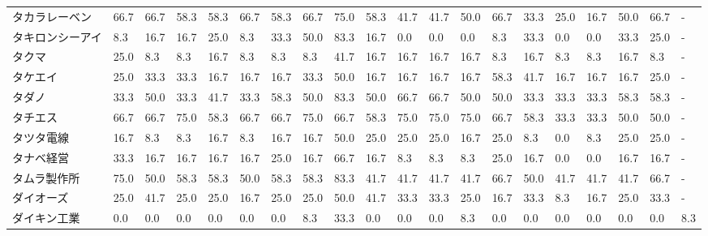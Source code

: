 \begin{tabular}{llllllllllllllllllll}
タカラレーベン         &   66.7 &   66.7 &      58.3 &      58.3 &       66.7 &   58.3 &   66.7 &   75.0 &    58.3 &    41.7 &   41.7 &  50.0 &   66.7 &    33.3 &    25.0 &  16.7 &  50.0 &  66.7 &     - \\
タキロンシーアイ        &    8.3 &   16.7 &      16.7 &      25.0 &        8.3 &   33.3 &   50.0 &   83.3 &    16.7 &     0.0 &    0.0 &   0.0 &    8.3 &    33.3 &     0.0 &   0.0 &  33.3 &  25.0 &     - \\
タクマ             &   25.0 &    8.3 &       8.3 &      16.7 &        8.3 &    8.3 &    8.3 &   41.7 &    16.7 &    16.7 &   16.7 &  16.7 &    8.3 &    16.7 &     8.3 &   8.3 &  16.7 &   8.3 &     - \\
タケエイ            &   25.0 &   33.3 &      33.3 &      16.7 &       16.7 &   16.7 &   33.3 &   50.0 &    16.7 &    16.7 &   16.7 &  16.7 &   58.3 &    41.7 &    16.7 &  16.7 &  16.7 &  25.0 &     - \\
タダノ             &   33.3 &   50.0 &      33.3 &      41.7 &       33.3 &   58.3 &   50.0 &   83.3 &    50.0 &    66.7 &   66.7 &  50.0 &   50.0 &    33.3 &    33.3 &  33.3 &  58.3 &  58.3 &     - \\
タチエス            &   66.7 &   66.7 &      75.0 &      58.3 &       66.7 &   66.7 &   75.0 &   66.7 &    58.3 &    75.0 &   75.0 &  75.0 &   66.7 &    58.3 &    33.3 &  33.3 &  50.0 &  50.0 &     - \\
タツタ電線           &   16.7 &    8.3 &       8.3 &      16.7 &        8.3 &   16.7 &   16.7 &   50.0 &    25.0 &    25.0 &   25.0 &  16.7 &   25.0 &     8.3 &     0.0 &   8.3 &  25.0 &  25.0 &     - \\
タナベ経営           &   33.3 &   16.7 &      16.7 &      16.7 &       16.7 &   25.0 &   16.7 &   66.7 &    16.7 &     8.3 &    8.3 &   8.3 &   25.0 &    16.7 &     0.0 &   0.0 &  16.7 &  16.7 &     - \\
タムラ製作所          &   75.0 &   50.0 &      58.3 &      58.3 &       50.0 &   58.3 &   58.3 &   83.3 &    41.7 &    41.7 &   41.7 &  41.7 &   66.7 &    50.0 &    41.7 &  41.7 &  41.7 &  66.7 &     - \\
ダイオーズ           &   25.0 &   41.7 &      25.0 &      25.0 &       16.7 &   25.0 &   25.0 &   50.0 &    41.7 &    33.3 &   33.3 &  25.0 &   16.7 &    33.3 &     8.3 &  16.7 &  25.0 &  33.3 &     - \\
ダイキン工業          &    0.0 &    0.0 &       0.0 &       0.0 &        0.0 &    0.0 &    8.3 &   33.3 &     0.0 &     0.0 &    0.0 &   8.3 &    0.0 &     0.0 &     0.0 &   0.0 &   0.0 &   0.0 &   8.3 \\

\end{tabular}
